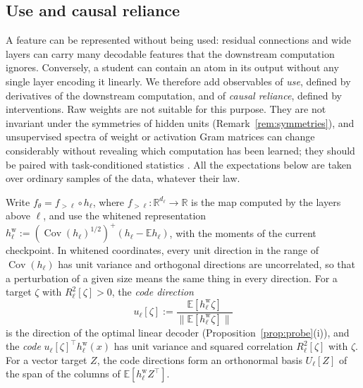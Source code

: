 \documentclass[11pt]{article}
\newcommand{\R}{\mathbb{R}}
\newcommand{\E}{\mathbb{E}}
\newcommand{\norm}[1]{\lVert #1\rVert}
\newcommand{\Cov}{\operatorname{Cov}}
\theoremstyle{definition}
\numberwithin{equation}{section}
\begin{document}
\subsection{Use and causal reliance}\label{sec:use}

A feature can be represented without being used: residual connections and wide layers can carry many decodable features that the downstream computation ignores. Conversely, a student can contain an atom in its output without any single layer encoding it linearly. We therefore add observables of \emph{use}, defined by derivatives of the downstream computation, and of \emph{causal reliance}, defined by interventions. Raw weights are not suitable for this purpose. They are not invariant under the symmetries of hidden units (Remark~\ref{rem:symmetries}), and unsupervised spectra of weight or activation Gram matrices can change considerably without revealing which computation has been learned; they should be paired with task-conditioned statistics \citep{hfl_review}. All the expectations below are taken over ordinary samples of the data, whatever their law.

Write $f_\theta=f_{>\ell}\circ h_\ell$, where $f_{>\ell}:\R^{d_\ell}\to\R$ is the map computed by the layers above $\ell$, and use the whitened representation $h^{\mathrm w}_\ell:=(\Cov(h_\ell)^{1/2})^+(h_\ell-\E h_\ell)$, with the moments of the current checkpoint. In whitened coordinates, every unit direction in the range of $\Cov(h_\ell)$ has unit variance and orthogonal directions are uncorrelated, so that a perturbation of a given size means the same thing in every direction. For a target $\zeta$ with $R^2_\ell[\zeta]>0$, the \emph{code direction}
\[
u_\ell[\zeta]:=\frac{\E[h^{\mathrm w}_\ell\zeta]}{\norm{\E[h^{\mathrm w}_\ell\zeta]}}
\]
is the direction of the optimal linear decoder (Proposition~\ref{prop:probe}(i)), and the \emph{code} $u_\ell[\zeta]^\top h^{\mathrm w}_\ell(x)$ has unit variance and squared correlation $R^2_\ell[\zeta]$ with $\zeta$. For a vector target $Z$, the code directions form an orthonormal basis $U_\ell[Z]$ of the span of the columns of $\E[h^{\mathrm w}_\ell Z^\top]$.
\end{document}
